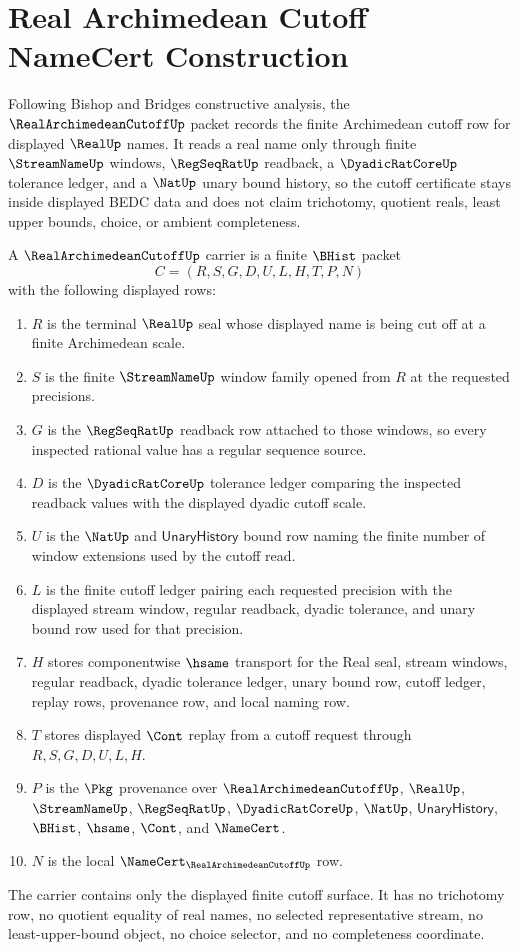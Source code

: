 \chapter{Real Archimedean Cutoff NameCert Construction}
\label{ch:concrete-instances-real-archimedean-cutoff-namecert}

Following Bishop and Bridges constructive analysis, the
$\RealArchimedeanCutoffUp$ packet records the finite Archimedean cutoff row
for displayed $\RealUp$ names. It reads a real name only through finite
$\StreamNameUp$ windows, $\RegSeqRatUp$ readback, a $\DyadicRatCoreUp$
tolerance ledger, and a $\NatUp$ unary bound history, so the cutoff certificate
stays inside displayed BEDC data and does not claim trichotomy, quotient reals,
least upper bounds, choice, or ambient completeness.

\begin{definition}
\label{def:real-archimedean-cutoff-carrier}
A $\RealArchimedeanCutoffUp$ carrier is a finite $\BHist$ packet
$$
C=(R,S,G,D,U,L,H,T,P,N)
$$
with the following displayed rows:
\begin{enumerate}
\item $R$ is the terminal $\RealUp$ seal whose displayed name is being cut off
at a finite Archimedean scale.
\item $S$ is the finite $\StreamNameUp$ window family opened from $R$ at the
requested precisions.
\item $G$ is the $\RegSeqRatUp$ readback row attached to those windows, so
every inspected rational value has a regular sequence source.
\item $D$ is the $\DyadicRatCoreUp$ tolerance ledger comparing the inspected
readback values with the displayed dyadic cutoff scale.
\item $U$ is the $\NatUp$ and $\mathsf{UnaryHistory}$ bound row naming the
finite number of window extensions used by the cutoff read.
\item $L$ is the finite cutoff ledger pairing each requested precision with
the displayed stream window, regular readback, dyadic tolerance, and unary
bound row used for that precision.
\item $H$ stores componentwise $\hsame$ transport for the Real seal, stream
windows, regular readback, dyadic tolerance ledger, unary bound row, cutoff
ledger, replay rows, provenance row, and local naming row.
\item $T$ stores displayed $\Cont$ replay from a cutoff request through
$R,S,G,D,U,L,H$.
\item $P$ is the $\Pkg$ provenance over $\RealArchimedeanCutoffUp$,
$\RealUp$, $\StreamNameUp$, $\RegSeqRatUp$, $\DyadicRatCoreUp$, $\NatUp$,
$\mathsf{UnaryHistory}$, $\BHist$, $\hsame$, $\Cont$, and $\NameCert$.
\item $N$ is the local $\NameCert_{\RealArchimedeanCutoffUp}$ row.
\end{enumerate}
The carrier contains only the displayed finite cutoff surface. It has no
trichotomy row, no quotient equality of real names, no selected representative
stream, no least-upper-bound object, no choice selector, and no completeness
coordinate.
\end{definition}

